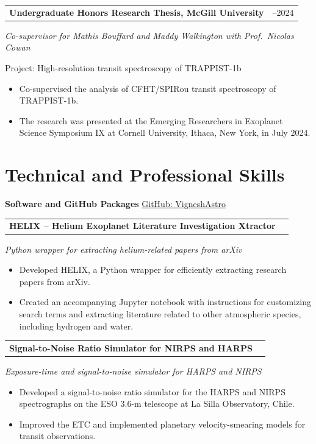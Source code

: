 \documentclass[10pt,a4paper]{article}
\makeatletter
\newcommand{\grantheading}[2]{%
\begin{tabularx}{\textwidth}{
    @{}
    >{\raggedright\arraybackslash}X
    >{\raggedleft\arraybackslash}p{4.5cm}
    @{}
}
\textbf{#1} & #2
\end{tabularx}
}
\newenvironment{lightitems}
{%
  \begin{itemize}[
      label=\textcolor{entrylight}{\textbullet},
      leftmargin=1.3em,
      itemsep=1pt,
      topsep=2pt,
      parsep=0pt
  ]
  \color{entrylight}
}
{%
  \end{itemize}
}
\makeatother
\begin{document}
\grantheading
{Undergraduate Honors Research Thesis, McGill University}
{2023--2024}
\emph{Co-supervisor for Mathis Bouffard and Maddy Walkington with
Prof.\ Nicolas Cowan}

Project: High-resolution transit spectroscopy of TRAPPIST-1b
\begin{lightitems}
\item
\vspace{-1.5mm}Co-supervised the analysis of CFHT/SPIRou transit spectroscopy of
TRAPPIST-1b.
\item
The research was presented at the Emerging Researchers in Exoplanet
Science Symposium IX at Cornell University, Ithaca, New York, in
July 2024.
\end{lightitems}

\section{Technical and Professional Skills}

\textbf{\color{navy}Software and GitHub Packages}
\hfill
\href{https://github.com/VigneshAstro}{GitHub: VigneshAstro}

\grantheading
{HELIX -- Helium Exoplanet Literature Investigation Xtractor}
{2024}
\emph{Python wrapper for extracting helium-related papers from arXiv}
\begin{lightitems}
\item
\vspace{-1.5mm}Developed HELIX, a Python wrapper for efficiently extracting research papers from arXiv.
\item
Created an accompanying Jupyter notebook with instructions for
customizing search terms and extracting literature related to other
atmospheric species, including hydrogen and water.
\end{lightitems}


\grantheading
{Signal-to-Noise Ratio Simulator for NIRPS and HARPS}
{2023}
\emph{Exposure-time and signal-to-noise simulator for HARPS and NIRPS}
\begin{lightitems}
\item
\vspace{-1.5mm}Developed a signal-to-noise ratio simulator for the HARPS and NIRPS
spectrographs on the ESO 3.6-m telescope at La Silla Observatory, Chile.
\item
Improved the ETC and implemented planetary velocity-smearing models for transit observations.
\end{lightitems}
\end{document}
